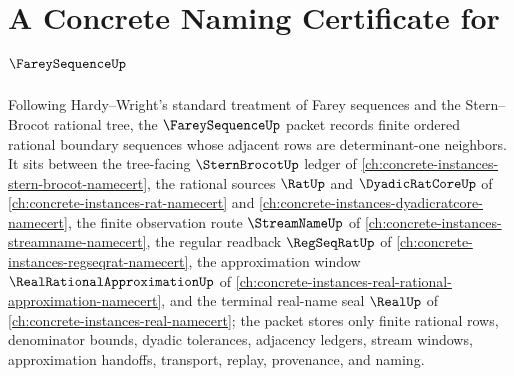 \chapter{A Concrete Naming Certificate for $\FareySequenceUp$}
\label{ch:concrete-instances-farey-sequence-namecert}

Following Hardy--Wright's standard treatment of Farey sequences and the Stern--Brocot rational tree, the $\FareySequenceUp$ packet records finite ordered rational boundary sequences whose adjacent rows are determinant-one neighbors. It sits between the tree-facing $\SternBrocotUp$ ledger of \autoref{ch:concrete-instances-stern-brocot-namecert}, the rational sources $\RatUp$ and $\DyadicRatCoreUp$ of \autoref{ch:concrete-instances-rat-namecert} and \autoref{ch:concrete-instances-dyadicratcore-namecert}, the finite observation route $\StreamNameUp$ of \autoref{ch:concrete-instances-streamname-namecert}, the regular readback $\RegSeqRatUp$ of \autoref{ch:concrete-instances-regseqrat-namecert}, the approximation window $\RealRationalApproximationUp$ of \autoref{ch:concrete-instances-real-rational-approximation-namecert}, and the terminal real-name seal $\RealUp$ of \autoref{ch:concrete-instances-real-namecert}; the packet stores only finite rational rows, denominator bounds, dyadic tolerances, adjacency ledgers, stream windows, approximation handoffs, transport, replay, provenance, and naming.

